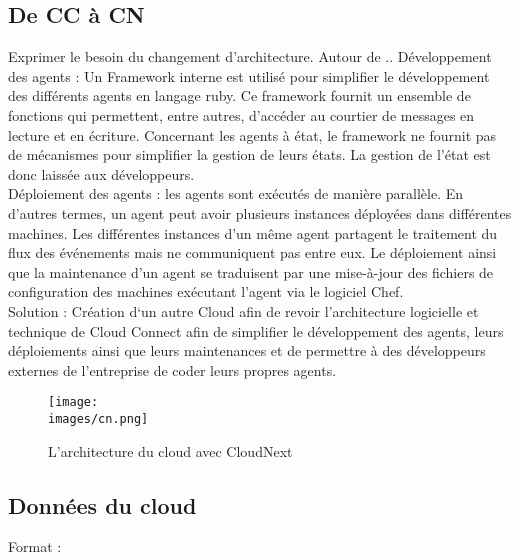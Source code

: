     \subsection{De \gls{CC} à \gls{CN}}
        Exprimer le besoin du changement d'architecture. 
        Autour de .. 
        Développement des agents : Un Framework interne est utilisé pour simplifier le développement des différents 
        agents en langage ruby. Ce framework fournit un ensemble de fonctions qui permettent, entre autres, d’accéder au 
        courtier de messages en lecture et en écriture. Concernant les agents à état, le framework ne fournit pas 
        de mécanismes pour simplifier la gestion de leurs états. La gestion de l’état est donc laissée aux développeurs.\\[0.3cm]
        Déploiement des agents : les agents sont exécutés de manière parallèle. En d’autres termes, un agent peut avoir 
        plusieurs instances déployées dans différentes machines. Les différentes instances d’un même agent partagent 
        le traitement du flux des événements mais ne communiquent pas entre eux. Le déploiement ainsi que la maintenance 
        d’un agent se traduisent par une mise-à-jour des fichiers de configuration des machines exécutant l’agent via le logiciel Chef.\\ [0.3cm]

        Solution :  Création d‘un autre Cloud afin de revoir l’architecture logicielle et technique de Cloud 
        Connect afin de simplifier le développement des agents, leurs déploiements ainsi que leurs maintenances et 
        de permettre à des développeurs externes de l’entreprise de coder leurs propres agents.



        \begin{figure}[ht]
            \centering
            \texttt{[image: \\images/cn.png]}
            \caption{L'architecture du cloud avec CloudNext}
        \end{figure}

        \vspace{0.2cm}

       

       

        \subsection{Données du cloud }

        Format : 

